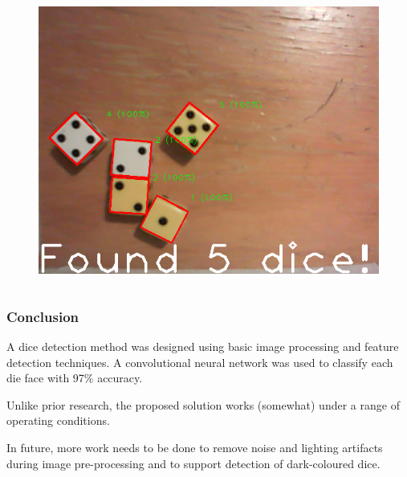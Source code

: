 \documentclass{beamer}
\begin{document}
\begin{frame}
\begin{columns}
\begin{figure}
	\centering
	\includegraphics[width=\textwidth]{dice_2}
\end{figure}

\end{columns}
	
\end{frame}



\begin{frame}
\frametitle{Conclusion}

A dice detection method was designed using basic image processing and feature detection techniques.
A convolutional neural network was used to classify each die face with 97\% accuracy.

\vspace{\baselineskip}

Unlike prior research, the proposed solution works (somewhat) under a range of operating conditions.

\vspace{\baselineskip}

In future, more work needs to be done to remove noise and lighting artifacts during image pre-processing and to support detection of dark-coloured dice.
	
\end{frame}
\end{document}
